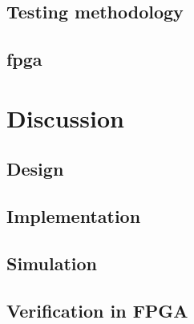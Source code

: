\documentclass{report}
\begin{document}
\section{Testing methodology}


\section{fpga}


\newpage
\chapter{Discussion}
\section{Design}


\section{Implementation}


\section{Simulation}


\section{Verification in FPGA}


\newpage
\end{document}
